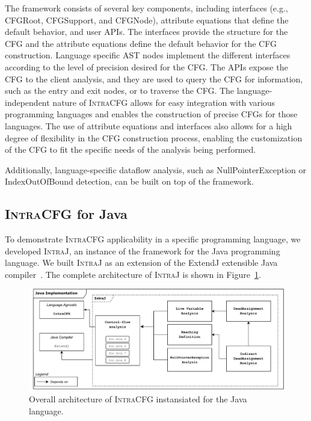 The framework consists of several key components, including interfaces
(e.g., CFGRoot, CFGSupport, and CFGNode), attribute equations that define the
default behavior, and user APIs. The interfaces provide the structure for the
CFG and the attribute equations define the default behavior for the CFG
construction. Language specific AST nodes implement the different interfaces 
according to the level of precision desired for the CFG.
The APIs expose the CFG to the client analysis, and they are used to query the CFG
for information, such as the entry and exit nodes, or to traverse the CFG.
The language-independent nature of \textsc{IntraCFG} allows for easy integration 
with various programming languages and enables the construction of precise CFGs 
for those languages. The use of attribute equations and interfaces also allows 
for a high degree of flexibility in the CFG construction process, 
enabling the customization of the CFG to fit the specific needs of the 
analysis being performed.

Additionally, language-specific dataflow analysis, such as NullPointerException or
IndexOutOfBound detection, can be built on top of the framework.





\subsection{\textsc{IntraCFG} for Java}
To demonstrate \textsc{IntraCFG} applicability in a specific programming language, we developed
\textsc{IntraJ}, an instance of the framework for the Java programming language.
We built \textsc{IntraJ} as an extension of the ExtendJ extensible Java compiler~\cite{DBLP:conf/oopsla/EkmanH07}.
The complete architecture of \textsc{IntraJ} is shown in Figure~\ref{fig:intraJ}.
\begin{figure}[H]
	\centering
	\includegraphics[scale=0.5]{kappa/img/architecturejava.pdf}
	\caption{\label{fig:intraJ} Overall architecture of \textsc{IntraCFG} instansiated for the Java language.}
\end{figure}

